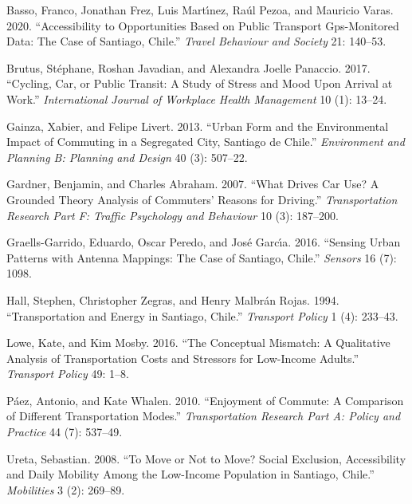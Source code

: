 \documentclass[
]{article}
\newlength{\cslhangindent}
\newlength{\cslentryspacingunit} %
\newenvironment{CSLReferences}[2] %
 {%
  \setlength{\parindent}{0pt}
  \ifodd #1
  \let\oldpar\par
  \def\par{\hangindent=\cslhangindent\oldpar}
  \fi
  \setlength{\parskip}{#2\cslentryspacingunit}
 }%
 {}
\begin{document}
\hypertarget{refs}{}
\begin{CSLReferences}{1}{0}
\leavevmode{}%
Basso, Franco, Jonathan Frez, Luis Martı́nez, Raúl Pezoa, and Mauricio
Varas. 2020. {``Accessibility to Opportunities Based on Public Transport
Gps-Monitored Data: The Case of Santiago, Chile.''} \emph{Travel
Behaviour and Society} 21: 140--53.

\leavevmode{}%
Brutus, Stéphane, Roshan Javadian, and Alexandra Joelle Panaccio. 2017.
{``Cycling, Car, or Public Transit: A Study of Stress and Mood Upon
Arrival at Work.''} \emph{International Journal of Workplace Health
Management} 10 (1): 13--24.

\leavevmode{}%
Gainza, Xabier, and Felipe Livert. 2013. {``Urban Form and the
Environmental Impact of Commuting in a Segregated City, Santiago de
Chile.''} \emph{Environment and Planning B: Planning and Design} 40 (3):
507--22.

\leavevmode{}%
Gardner, Benjamin, and Charles Abraham. 2007. {``What Drives Car Use? A
Grounded Theory Analysis of Commuters' Reasons for Driving.''}
\emph{Transportation Research Part F: Traffic Psychology and Behaviour}
10 (3): 187--200.

\leavevmode{}%
Graells-Garrido, Eduardo, Oscar Peredo, and José Garcı́a. 2016.
{``Sensing Urban Patterns with Antenna Mappings: The Case of Santiago,
Chile.''} \emph{Sensors} 16 (7): 1098.

\leavevmode{}%
Hall, Stephen, Christopher Zegras, and Henry Malbrán Rojas. 1994.
{``Transportation and Energy in Santiago, Chile.''} \emph{Transport
Policy} 1 (4): 233--43.

\leavevmode{}%
Lowe, Kate, and Kim Mosby. 2016. {``The Conceptual Mismatch: A
Qualitative Analysis of Transportation Costs and Stressors for
Low-Income Adults.''} \emph{Transport Policy} 49: 1--8.

\leavevmode{}%
Páez, Antonio, and Kate Whalen. 2010. {``Enjoyment of Commute: A
Comparison of Different Transportation Modes.''} \emph{Transportation
Research Part A: Policy and Practice} 44 (7): 537--49.

\leavevmode{}%
Ureta, Sebastian. 2008. {``To Move or Not to Move? Social Exclusion,
Accessibility and Daily Mobility Among the Low-Income Population in
Santiago, Chile.''} \emph{Mobilities} 3 (2): 269--89.

\end{CSLReferences}
\end{document}
